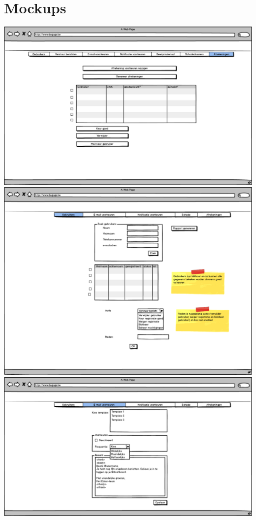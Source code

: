 \documentclass[]{article}
\begin{document}
\section{Mockups}

\includegraphics[scale=0.4]{mockups/admin_afrekeningen.png}
\includegraphics[scale=0.4]{mockups/admin_dashboard_gebruikers.png}
\includegraphics[scale=0.4]{mockups/admin_dashboard_mailvoorkeuren.png}
\end{document}
